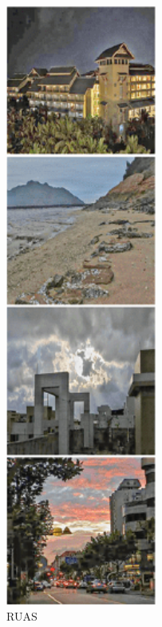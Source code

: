 \documentclass[CJK,aspectratio=169]{beamer}  %
\begin{document}
\begin{frame}
\begin{figure}
\begin{minipage}{.08\paperwidth}
			\label{fig: RUAS}	
			\caption*{\tiny RUAS}
		\end{minipage}
		\begin{minipage}{.08\paperwidth}
			\centering
			\setlength{\abovecaptionskip}{-0.45cm}
			\includegraphics[width=\linewidth]{picture/LLIE/LightingNet/TBEFN}

\end{minipage}
\end{figure}
\end{frame}
\end{document}
